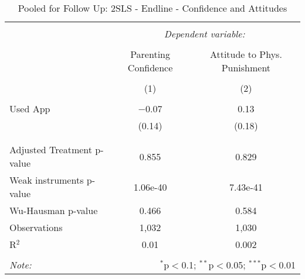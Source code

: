 
\begin{table}[!htbp] \centering 
  \caption{Pooled for Follow Up: 2SLS - Endline - Confidence and Attitudes} 
  \label{tbl:Pooled for Follow Up: 2SLS - Endline - Confidence and Attitudes} 
\begin{tabular}{@{\extracolsep{5pt}}lcc} 
\\[-1.8ex]\hline 
\hline \\[-1.8ex] 
 & \multicolumn{2}{c}{\textit{Dependent variable:}} \\ 
\cline{2-3} 
\\[-1.8ex] & Parenting Confidence & Attitude to Phys. Punishment \\ 
\\[-1.8ex] & (1) & (2)\\ 
\hline \\[-1.8ex] 
 Used App & $-$0.07 & 0.13 \\ 
  & (0.14) & (0.18) \\ 
  & & \\ 
\hline \\[-1.8ex] 
Adjusted Treatment p-value & 0.855 & 0.829 \\ 
Weak instruments p-value & 1.06e-40 & 7.43e-41 \\ 
Wu-Hausman p-value & 0.466 & 0.584 \\ 
Observations & 1,032 & 1,030 \\ 
R$^{2}$ & 0.01 & 0.002 \\ 
\hline 
\hline \\[-1.8ex] 
\textit{Note:}  & \multicolumn{2}{r}{$^{*}$p$<$0.1; $^{**}$p$<$0.05; $^{***}$p$<$0.01} \\ 
\end{tabular} 
\end{table} 
